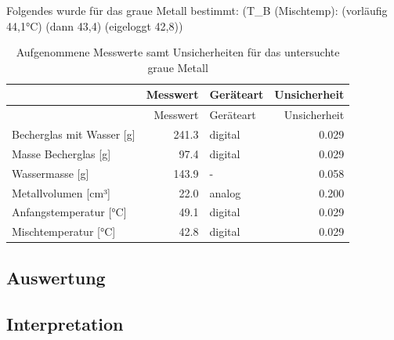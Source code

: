 \documentclass[
  9pt,
]{article}
\begin{document}
Folgendes wurde für das graue Metall bestimmt: (T\_B (Mischtemp):
(vorläufig 44,1°C) (dann 43,4) (eigeloggt 42,8))

\begin{longtable}[]{@{}lrlr@{}}
\caption{Aufgenommene Messwerte samt Unsicherheiten für das untersuchte
graue Metall}\tabularnewline
\toprule()
& Messwert & Geräteart & Unsicherheit \\
\midrule()
\endfirsthead
\toprule()
& Messwert & Geräteart & Unsicherheit \\
\midrule()
\endhead
Becherglas mit Wasser {[}g{]} & 241.3 & digital & 0.029 \\
Masse Becherglas {[}g{]} & 97.4 & digital & 0.029 \\
Wassermasse {[}g{]} & 143.9 & - & 0.058 \\
Metallvolumen {[}cm³{]} & 22.0 & analog & 0.200 \\
Anfangstemperatur {[}°C{]} & 49.1 & digital & 0.029 \\
Mischtemperatur {[}°C{]} & 42.8 & digital & 0.029 \\
\bottomrule()
\end{longtable}

\hypertarget{auswertung-1}{%
\subsection{Auswertung}\label{auswertung-1}}

\hypertarget{interpretation-1}{%
\subsection{Interpretation}\label{interpretation-1}}
\end{document}
